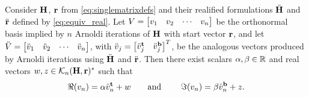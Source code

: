 \medskip
\begin{theorem} \label{thm:eqbases}Consider $\textbf{\textup{H}}$, $\textbf{\textup{r}}$ from \eqref{eq:singlematrixdefs} and their realified formulations ${\ddot{\textbf{\textup{H}}}}$ and $\ddot{\textbf{\textup{r}}}$ defined by \eqref{eq:equiv_real}.  Let
$V=\begin{bmatrix} v_1&v_2&\cdots&v_n\end{bmatrix}$ be the orthonormal basis implied by $n$ Arnoldi iterations of $\textbf{\textup{H}}$ with start vector $\textbf{\textup{r}}$, and let $\ddot{V}= \begin{bmatrix} \ddot{v}_1&\ddot{v}_2&\cdots&\ddot{v}_n\end{bmatrix}$, with $\ddot{v}_j = \begin{bmatrix} \ddot{v}^{\mathrm{\bf{t}}}_{j}& \ddot{v}^{\mathrm{\bf{b}}}_{j}\end{bmatrix}^T$, be the analogous vectors produced by Arnoldi iterations using ${\ddot{\textbf{\textup{H}}}}$ and $\ddot{\textbf{\textup{r}}}$.
Then there exist scalars $\alpha, \beta\in\mathbb{R}$ and real vectors $w,z\in \mathcal{K}_{n}({\textbf{\textup{H}}},{\textbf{\textup{r}}})^*$ such that
	\begin{equation}
	   	\Re(v_n) = \alpha\ddot{v}^{\mathrm{\bf{t}}}_{n} + w \qquad\text{and }\qquad
		 \Im(v_n) = \beta\ddot{v}^{\mathrm{\bf{b}}}_{n} + z.
     \label{eq:equ_bases}
	\end{equation}
\end{theorem}

